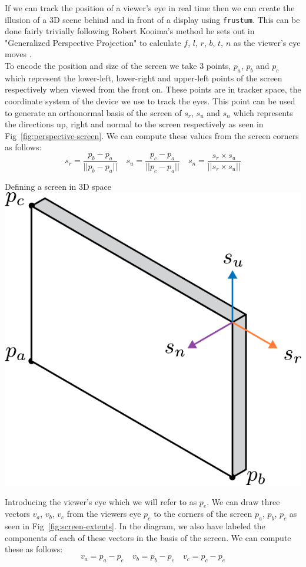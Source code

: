 If we can track the position of a viewer's eye in real time then we can create the illusion of a 3D scene behind and in front of a display using \texttt{frustum}. This can be done fairly trivially following Robert Kooima's method he sets out in "Generalized Perspective Projection" to calculate $f$, $l$, $r$, $b$, $t$, $n$ as the viewer's eye moves \cite{kooima2009generalized}. \\



To encode the position and size of the screen we take 3 points, $p_a$, $p_b$ and $p_c$ which represent the lower-left, lower-right and upper-left points of the screen respectively when viewed from the front on. These points are in tracker space, the coordinate system of the device we use to track the eyes. This point can be used to generate an orthonormal basis of the screen of $s_r$, $s_u$ and $s_n$ which represents the directions up, right and normal to the screen respectively as seen in Fig~\ref{fig:perspective-screen}. We can compute these values from the screen corners as follows:
\[s_r = \frac{p_b-p_a}{||p_b-p_a||} \quad s_u = \frac{p_c-p_a}{||p_c-p_a||} \quad s_n = \frac{s_r\times s_u}{||s_r \times s_u||}\]

\begin{figureBox}[label={fig:perspective-screen}, width=0.8\linewidth]{Defining a screen in 3D space}
    \includegraphics[width = 0.3\linewidth]{./background/figures/projection/screen.pdf}
\end{figureBox}

Introducing the viewer's eye which we will refer to as $p_e$. We can draw three vectors $v_a$, $v_b$, $v_c$ from the viewers eye $p_e$ to the corners of the screen $p_a$, $p_b$, $p_c$ as seen in Fig~\ref{fig:screen-extents}. In the diagram, we also have labeled the components of each of these vectors in the basis of the screen. We can compute these as follows:
\[ v_a = p_a - p_e \quad v_b = p_b - p_e \quad v_c = p_c - p_e\] \\

